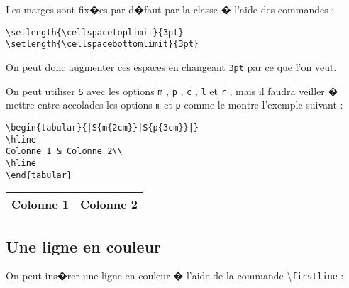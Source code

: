 \documentclass[ams,openany,10pt,presentation,latin1]{mathbook}
\begin{document}
Les marges sont fix�es par d�faut par la classe � l'aide des commandes :

\medskip

\begin{lstlisting}
\setlength{\cellspacetoplimit}{3pt}
\setlength{\cellspacebottomlimit}{3pt}
\end{lstlisting}

On peut donc augmenter ces espaces en changeant \og \texttt{3pt} \fg{} par ce que l'on veut.

\medskip

On peut utiliser \og \texttt{S} \fg{} avec les options \og \texttt{m} \fg, \og \texttt{p} \fg, \og \texttt{c} \fg, \og \texttt{l} \fg{} et \og \texttt{r} \fg, mais il faudra veiller � mettre entre accolades les options \og \texttt{m} \fg{} et \og \texttt{p} \fg{} comme le montre l'exemple suivant :

\medskip

\begin{minipage}{0.5\linewidth}
\begin{lstlisting}
\begin{tabular}{|S{m{2cm}}|S{p{3cm}}|}
\hline
Colonne 1 & Colonne 2\\
\hline
\end{tabular}
\end{lstlisting}
\end{minipage}
\begin{minipage}{0.45\linewidth}
\begin{center}
\begin{tabular}{|S{m{2cm}}|S{p{2cm}}|}
\hline
Colonne 1 & Colonne 2\\
\hline
\end{tabular}
\end{center}
\end{minipage}

\subsection{Une ligne en couleur}

On peut ins�rer une ligne en couleur � l'aide de la commande \textbackslash\texttt{firstline} :

\medskip
\end{document}
